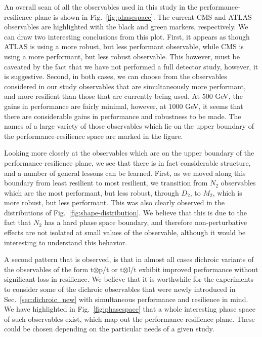 \documentclass[11pt,letterpaper]{article}
\DeclareRobustCommand{\Sec}[1]{Sec.~\ref{#1}}
\DeclareRobustCommand{\Fig}[1]{Fig.~\ref{#1}}
\begin{document}
An overall scan of all the observables used in this study in the performance-resilience plane is shown in \Fig{fig:phasespace}. The current CMS and ATLAS observables are highlighted with the black and green markers, respectively. We can draw two interesting conclusions from this plot. First, it appears as though ATLAS is using a more robust, but less performant observable, while CMS is using a more performant, but less robust observable. This however, must be caveated by the fact that we have not performed a full detector study, however, it is suggestive. Second, in both cases, we can choose from the observables considered in our study observables that are simultaneously more performant, and more resilient than those that are currently being used. At $500$ GeV, the gains in performance are fairly minimal, however, at $1000$ GeV, it seems that there are considerable gains in performance and robustness to be made.
The names of a large variety of those observables which lie on the upper boundary of the performance-resilience space are marked in the figure. 


Looking more closely at the observables which are on the upper boundary of the performance-resilience plane, we see that there is in fact considerable structure, and a number of general lessons can be learned. First, as we moved along this boundary from least resilient to most resilient, we transition from $N_2$ observables which are the most performant, but less robust, through $D_2$, to $M_2$, which is more robust, but less performant. This was also clearly observed in the distributions of \Fig{fig:shape-distribution}. We believe that this is due to the fact that $N_2$ has a hard phase space boundary, and therefore non-perturbative effects are not isolated at small values of the observable, although it would be interesting to understand this behavior. 

A second pattern that is observed, is that in almost all cases dichroic variants of the observables of the form t$\otimes$p/t or t$\otimes$l/t exhibit improved performance without significant loss in resilience.  We believe that it is worthwhile for the experiments to consider some of the  dichroic observables that were newly introduced in \Sec{sec:dichroic_new} with simultaneous performance and resilience in mind. We have highlighted in \Fig{fig:phasespace} that a whole interesting phase space of such observables exist, which map out the performance-resilience plane. These could be chosen depending on the particular needs of a given study.
\end{document}
